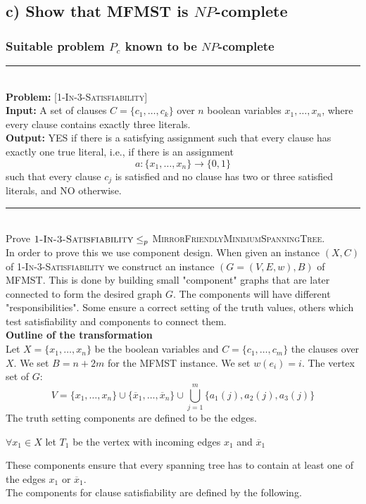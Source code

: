 \documentclass[12pt]{article}
\newcommand{\HRule}{\rule{\linewidth}{0.075mm}}
\begin{document}
\subsection*{c) Show that MFMST is $NP$-complete}
\subsubsection*{Suitable problem $P_c$ known to be $NP$-complete}
\HRule\\
\textbf{Problem:} \textsc{[1-In-3-Satisfiability]}\\
\textbf{Input:} A set of clauses $C = \{c_1,\dots,c_k\}$ over $n$ boolean variables $x_1,\dots,x_n$, where every clause contains exactly three literals.\\
\textbf{Output:} YES if there is a satisfying assignment such that every clause has exactly one true literal, i.e., if there is an assignment
$$a: \{x_1,\dots,x_n\} \rightarrow \{0,1\}$$
such that every clause $c_j$ is satisfied and no clause has two or three satisfied literals, and NO otherwise.\\
\HRule\\
Prove $\textsc{1-In-3-Satisfiability} \leq_p$ \textsc{MirrorFriendlyMinimumSpanningTree}.\\
In order to prove this we use component design. When given an instance $(X,C)$ of \textsc{1-In-3-Satisfiability} we construct an instance $(G = (V, E,w),B)$ of MFMST. This is done by building small "component" graphs that are later connected to form the desired graph $G$. The components will have different "responsibilities". Some ensure a correct setting of the truth values, others which test satisfiability and components to connect them.
\\[0.25cm]\textbf{Outline of the transformation}\\
Let $X = \{x_1,\dots,x_n\}$ be the boolean variables and $C = \{c_1,\dots,c_m\}$ the clauses over $X$. We set $B = n + 2m$ for the MFMST instance. We set $w(e_i) = i$. The vertex set of $G$:
$$V = \{x_1,\dots,x_n\} \cup \{\overline{x}_1,\dots,\overline{x}_n\} \cup \bigcup_{j=1}^{m}{\{a_1(j),a_2(j),a_3(j)\}}$$
The truth setting components are defined to be the edges.
\begin{center}
$\forall x_1 \in X$ let $T_1$ be the vertex with incoming edges $x_1$ and $\overline{x}_1$
\end{center}
These components ensure that every spanning tree has to contain at least one of the edges $x_1$ or $\overline{x}_1$.\\
The components for clause satisfiability are defined by the following.
\end{document}

